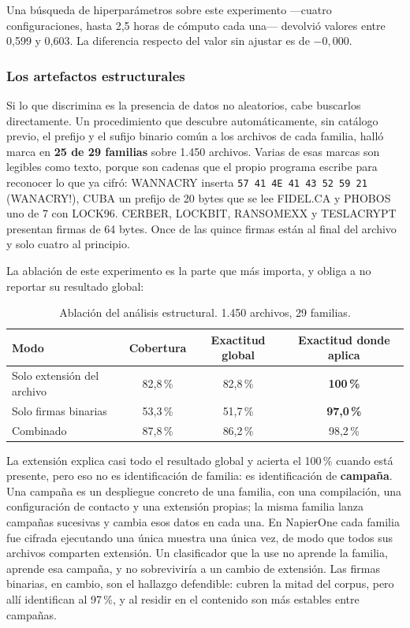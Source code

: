 \documentclass[11pt,a4paper]{article}
\begin{document}
Una búsqueda de hiperparámetros sobre este experimento ---cuatro configuraciones, hasta 2,5
horas de cómputo cada una--- devolvió valores entre 0,599 y 0,603. La diferencia respecto del
valor sin ajustar es de $-0{,}000$.

\subsubsection{Los artefactos estructurales}

Si lo que discrimina es la presencia de datos no aleatorios, cabe buscarlos directamente. Un
procedimiento que descubre automáticamente, sin catálogo previo, el prefijo y el sufijo
binario común a los archivos de cada familia, halló marca en \textbf{25 de 29 familias} sobre
1.450 archivos. Varias de esas marcas son legibles como texto, porque son cadenas que el
propio programa escribe para reconocer lo que ya cifró: WANNACRY inserta
\texttt{57~41~4E~41~43~52~59~21} (\guillemotleft WANACRY!\guillemotright), CUBA un prefijo de
20 bytes que se lee \guillemotleft FIDEL.CA\guillemotright{} y PHOBOS uno de 7 con
\guillemotleft LOCK96\guillemotright. CERBER, LOCKBIT, RANSOMEXX y TESLACRYPT presentan firmas
de 64 bytes. Once de las quince firmas están al final del archivo y solo cuatro al principio.

La ablación de este experimento es la parte que más importa, y obliga a no reportar su
resultado global:

\begin{table}[h]
\centering\small
\caption{Ablación del análisis estructural. 1.450 archivos, 29 familias.}
\begin{tabular}{@{}lccc@{}}
\toprule
\textbf{Modo} & \textbf{Cobertura} & \textbf{Exactitud global} & \textbf{Exactitud donde aplica} \\
\midrule
Solo extensión del archivo & 82,8\,\% & 82,8\,\% & \textbf{100\,\%} \\
Solo firmas binarias & 53,3\,\% & 51,7\,\% & \textbf{97,0\,\%} \\
Combinado & 87,8\,\% & 86,2\,\% & 98,2\,\% \\
\bottomrule
\end{tabular}
\end{table}

La extensión explica casi todo el resultado global y acierta el 100\,\% cuando está presente,
pero eso no es identificación de familia: es identificación de \textbf{campaña}. Una campaña es
un despliegue concreto de una familia, con una compilación, una configuración de contacto y una
extensión propias; la misma familia lanza campañas sucesivas y cambia esos datos en cada una.
En NapierOne cada familia fue cifrada ejecutando una única muestra una única vez, de modo que
todos sus archivos comparten extensión. Un clasificador que la use no aprende la familia,
aprende esa campaña, y no sobreviviría a un cambio de extensión. Las firmas binarias, en
cambio, son el hallazgo defendible: cubren la mitad del corpus, pero allí identifican al
97\,\%, y al residir en el contenido son más estables entre campañas.
\end{document}
